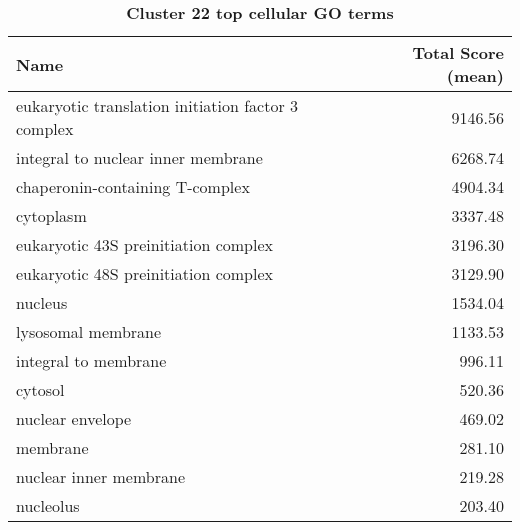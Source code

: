 \begin{table}[h]
\begin{center} \sf
\begin{tabular}{@{}lr@{}}
\toprule
\textbf{Name}                                      & \textbf{Total Score (mean)} \\ \midrule
eukaryotic translation initiation factor 3 complex & 9146.56                     \\
integral to nuclear inner membrane                 & 6268.74                     \\
chaperonin-containing T-complex                    & 4904.34                     \\
cytoplasm                                          & 3337.48                     \\
eukaryotic 43S preinitiation complex               & 3196.30                     \\
eukaryotic 48S preinitiation complex               & 3129.90                     \\
nucleus                                            & 1534.04                     \\
lysosomal membrane                                 & 1133.53                     \\
integral to membrane                               & 996.11                      \\
cytosol                                            & 520.36                      \\
nuclear envelope                                   & 469.02                      \\
membrane                                           & 281.10                      \\
nuclear inner membrane                             & 219.28                      \\
nucleolus                                          & 203.40                      \\ \bottomrule
\end{tabular}
\end{center}

\caption[Cluster 22 top cellular GO terms]{\sf \textbf{Cluster 22 top cellular GO terms}}
\label{tab:cls22-cellular}
\end{table}